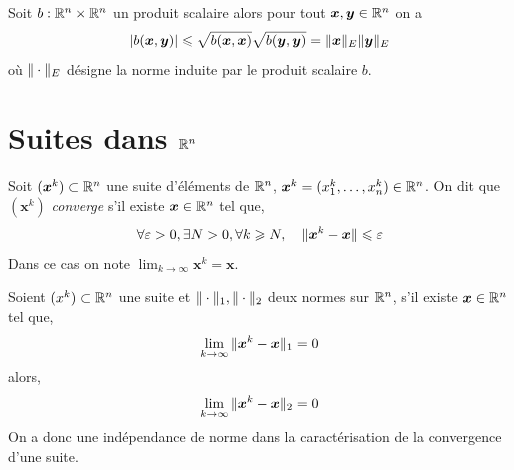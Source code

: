 \begin{lemme}
	Soit $b : \mathbb{R}^n \times \mathbb{R}^n$ un produit scalaire alors pour tout $\bm x, \bm y \in \mathbb{R}^n$ on a
	\[
	|b(\bm x, \bm y)| \leqslant \sqrt{b(\bm x, \bm x)}\sqrt{b(\bm y, \bm y)} = \| \bm x \|_E \| \bm y \|_E
	\]
	où $\| \cdot \|_E$ désigne la norme induite par le produit scalaire $b$.
\end{lemme}

	

\section{Suites dans $\mathbb{R}^n$}

\begin{definition} \label{def: suite convergente}
	Soit $(\bm x^k) \subset \mathbb{R}^n$ une suite d'éléments de $\mathbb{R}^n$, $\bm x^k = (x_1^k, \ldots, x_n^k) \in \mathbb{R}^n$. On dit que $(\bm x^k)$ \emph{converge} s'il existe $\bm x \in \mathbb{R}^n$ tel que,
\[
\forall \varepsilon > 0, \exists N > 0, \forall k \geqslant N, \quad \| \bm x^k - \bm x \| \leqslant  \varepsilon
\]
Dans ce cas on note $\lim_{k \to \infty} \bm x^k = \bm x$.
\end{definition}


\begin{proposition} \label{prop: indépendance de la norme}
	Soient $(x^k) \subset \mathbb{R}^n $ une suite et $\| \cdot \|_1, \| \cdot \|_2$ deux normes sur $\mathbb{R}^n$, s'il existe $\bm x \in \mathbb{R}^n$ tel que,
	\[
	\lim_{k \to \infty} \| \bm x^k - \bm x \|_1 = 0
	\]
	alors,
	\[
	\lim_{k \to \infty} \| \bm x^k - \bm x \|_2 = 0
	\]
On a donc une indépendance de norme dans la caractérisation de la convergence d'une suite.
\end{proposition}




